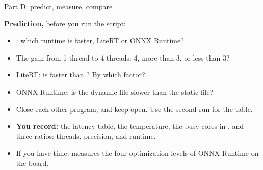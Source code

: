 \begin{frame}{Part D: predict, measure, compare}
  \begin{exerciseblock}
    \textbf{Prediction,} before you run the script:
    \begin{itemize}
      \item {}: which runtime is faster, LiteRT or ONNX
            Runtime?
      \item The gain from 1 thread to 4 threads: 4, more than 3, or less
            than 3?
      \item LiteRT: is  faster than ? By which
            factor?
      \item ONNX Runtime: is the dynamic file slower than the static file?
    \end{itemize}
  \end{exerciseblock}
  \small
  \begin{itemize}
    \item Close each other program, and keep  open. Use the
          second run for the table.
    \item \textbf{You record:} the latency table, the temperature, the busy
          cores in , and three ratios: threads, precision, and
          runtime.
    \item If you have time:  measures
          the four optimization levels of ONNX Runtime on the board.
  \end{itemize}
\end{frame}
